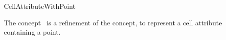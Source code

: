 \ccRefPageBegin
\begin{ccRefConcept}{CellAttributeWithPoint}

\ccDefinition
  
The concept \ccRefName\ is a refinement of the 
concept, to represent a cell attribute containing a point.

\ccRefines
{}  %

\ccTypes
{} %






\ccCreation
{}


\end{ccRefConcept}
